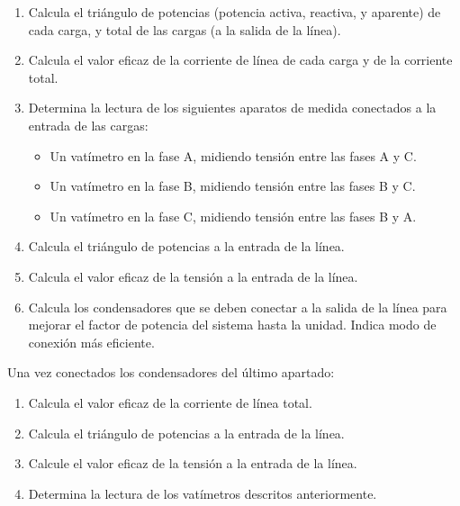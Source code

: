 \begin{enumerate}
 \begin{enumerate}
 \item Calcula el triángulo de potencias (potencia activa, reactiva, y
   aparente) de cada carga, y total de las cargas (a la salida de la
   línea).
 \item Calcula el valor eficaz de la corriente de línea de
   cada carga y de la corriente total.
 \item Determina la lectura de los siguientes aparatos de medida
   conectados a la entrada de las cargas:
   \begin{itemize}
   \item Un vatímetro en la fase A, midiendo tensión entre las fases A
     y C.
   \item Un vatímetro en la fase B, midiendo tensión entre las fases B
     y C.
   \item Un vatímetro en la fase C, midiendo tensión entre las fases B
     y A.
   \end{itemize}
 \item Calcula el triángulo de potencias a la entrada de la línea.
 \item Calcula el valor eficaz de la tensión a la entrada de la línea.
 \item Calcula los condensadores que se deben conectar a la salida de
   la línea para mejorar el factor de potencia del sistema hasta la
   unidad. Indica modo de conexión más eficiente.
 \end{enumerate}

Una vez conectados los condensadores del último apartado:
\begin{enumerate}[resume]
\item Calcula el valor eficaz de la corriente de línea total.
\item Calcula el triángulo de potencias a la entrada de la línea.
\item Calcule el valor eficaz de la tensión a la entrada de la línea.
\item Determina la lectura de los vatímetros descritos anteriormente.
\end{enumerate}


\end{enumerate}
